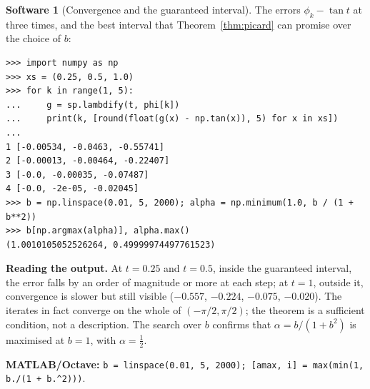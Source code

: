 \documentclass[11pt,a4paper]{article}
\numberwithin{equation}{section}
\theoremstyle{definition}
\newtheorem{software}[thm]{Software}
\begin{document}
\begin{software}[Convergence and the guaranteed interval]
\label{sw:picardconv}
The errors $\phi_k - \tan t$ at three times, and the best interval that Theorem~\ref{thm:picard} can promise over the choice of $b$:
{\small\begin{verbatim}
>>> import numpy as np
>>> xs = (0.25, 0.5, 1.0)
>>> for k in range(1, 5):
...     g = sp.lambdify(t, phi[k])
...     print(k, [round(float(g(x) - np.tan(x)), 5) for x in xs])
...
1 [-0.00534, -0.0463, -0.55741]
2 [-0.00013, -0.00464, -0.22407]
3 [-0.0, -0.00035, -0.07487]
4 [-0.0, -2e-05, -0.02045]
>>> b = np.linspace(0.01, 5, 2000); alpha = np.minimum(1.0, b / (1 + b**2))
>>> b[np.argmax(alpha)], alpha.max()
(1.0010105052526264, 0.49999974497761523)
\end{verbatim}}
\textbf{Reading the output.} At $t = 0.25$ and $t = 0.5$, inside the guaranteed interval, the error falls by an order of magnitude or more at each step; at $t = 1$, outside it,
convergence is slower but still visible ($-0.557$, $-0.224$, $-0.075$, $-0.020$). The iterates in fact converge on the whole of $(-\pi/2, \pi/2)$; the theorem is a sufficient condition,
not a description. The search over $b$ confirms that $\alpha = b/(1 + b^2)$ is maximised at $b = 1$, with $\alpha = \frac12$.

\textbf{MATLAB/Octave:} \texttt{b = linspace(0.01, 5, 2000); [amax, i] = max(min(1, b./(1 + b.\^{}2)))}.
\end{software}
\end{document}
